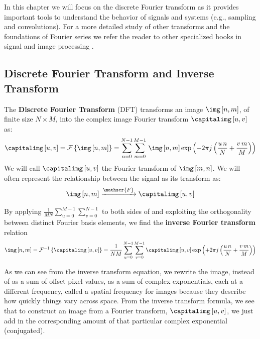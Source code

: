 In this chapter we will focus on the discrete Fourier transform as it provides important tools to understand the behavior of signals and systems (e.g., sampling and convolutions). For a more detailed study of other transforms and the foundations of Fourier series we refer the reader to other specialized books in signal and image processing .

\subsection{Discrete Fourier Transform and Inverse Transform}

The {\bf Discrete Fourier Transform} (DFT) transforms an image $\img \left[n,m \right]$, of finite size $N \times M$, into the complex image Fourier transform $\capitalimg \left[u,v \right]$ as:
\begin{equation}
\capitalimg \left[u,v \right] =  
\mathcal{F} \left\{ \img \left[n,m \right] \right\}
=
\sum_{n=0}^{N-1} \sum_{m=0}^{M-1} \, \img \left[n,m \right] 
\exp{ \left( -2\pi j \left( \frac{u\, n}{N} + \frac{v\, m}{M} \right) \right)}
\label{eq:fourier}
\end{equation}
We will call $\capitalimg \left[u,v \right]$ the Fourier transform of $\img \left[m,n \right]$. We will often represent the relationship between the signal as its transform as:
\begin{equation}
\img \left[n,m \right] \xrightarrow{\mathscr{F}} \capitalimg \left[u,v \right]
\end{equation}


By applying 
$\frac{1}{MN} \sum_{u=0}^{M-1} \sum_{v=0}^{N-1}$
to both sides of \eqn{\ref{eq:fourier}} and exploiting the orthogonality between distinct Fourier basis elements, we find the {\bf inverse Fourier transform} relation
\begin{equation}
\img \left[n,m \right] = 
\mathcal{F}^{-1} \left\{ \capitalimg \left[u,v \right] \right\}
=
\frac{1}{NM} \sum_{u=0}^{N-1} \sum_{v=0}^{M-1} \capitalimg \left[u,v \right] 
\exp{ \left(+2\pi j \left(\frac{u\, n}{N} + \frac{v\, m}{M} \right) \right) }
\label{eq:inversefourier}
\end{equation}


As we can see from the inverse transform equation, we rewrite the image, instead of as a sum of offset pixel
values, as a sum of complex exponentials, each at a different frequency, called a spatial frequency for images because they describe
how quickly things vary across space.  From the inverse transform formula, we see that to construct an image
from a Fourier transform, $\capitalimg \left[u,v \right]$, we just add in the corresponding
amount of that particular complex exponential (conjugated).


